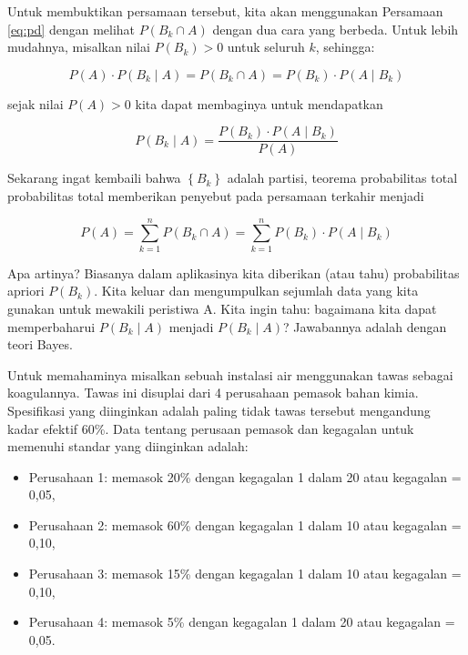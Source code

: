 \documentclass[]{book}
\providecommand{\tightlist}{%
  \setlength{\itemsep}{0pt}\setlength{\parskip}{0pt}}
\begin{document}
Untuk membuktikan persamaan tersebut, kita akan menggunakan Persamaan
\eqref{eq:pd} dengan melihat \(P\left(B_k\cap A\right)\) dengan dua cara
yang berbeda. Untuk lebih mudahnya, misalkan nilai
\(P\left(B_k\right)>0\) untuk seluruh \(k\), sehingga:

\begin{equation}
   P\left(A\right)\cdot P\left(B_k\mid A\right)=P\left(B_k\cap A\right)=P\left(B_k\right)\cdot P\left(A\mid B_k\right)
  \label{eq:tb2}
\end{equation}

sejak nilai \(P\left(A\right)>0\) kita dapat membaginya untuk
mendapatkan

\begin{equation}
   P\left(B_k\mid A\right)=\frac{P\left(B_k\right)\cdot P\left(A\mid B_k\right)}{P\left(A\right)}
  \label{eq:tb3}
\end{equation}

Sekarang ingat kembaili bahwa \(\left\{B_k\right\}\) adalah partisi,
teorema probabilitas total probabilitas total memberikan penyebut pada
persamaan terkahir menjadi

\begin{equation}
   P\left(A\right)=\sum_{k=1}^nP\left(B_k\cap A\right)=\sum_{k=1}^nP\left(B_k\right)\cdot P\left(A\mid B_k\right)
  \label{eq:tb4}
\end{equation}

Apa artinya? Biasanya dalam aplikasinya kita diberikan (atau tahu)
probabilitas apriori \(P\left(B_k\right)\). Kita keluar dan mengumpulkan
sejumlah data yang kita gunakan untuk mewakili peristiwa A. Kita ingin
tahu: bagaimana kita dapat memperbaharui \(P\left(B_k\mid A\right)\)
menjadi \(P\left(B_k\mid A\right)\)? Jawabannya adalah dengan teori
Bayes.

Untuk memahaminya misalkan sebuah instalasi air menggunakan tawas
sebagai koagulannya. Tawas ini disuplai dari 4 perusahaan pemasok bahan
kimia. Spesifikasi yang diinginkan adalah paling tidak tawas tersebut
mengandung kadar efektif 60\%. Data tentang perusaan pemasok dan
kegagalan untuk memenuhi standar yang diinginkan adalah:

\begin{itemize}
\tightlist
\item
  Perusahaan 1: memasok 20\% dengan kegagalan 1 dalam 20 atau kegagalan
  = 0,05,
\item
  Perusahaan 2: memasok 60\% dengan kegagalan 1 dalam 10 atau kegagalan
  = 0,10,
\item
  Perusahaan 3: memasok 15\% dengan kegagalan 1 dalam 10 atau kegagalan
  = 0,10,
\item
  Perusahaan 4: memasok 5\% dengan kegagalan 1 dalam 20 atau kegagalan =
  0,05.
\end{itemize}
\end{document}
